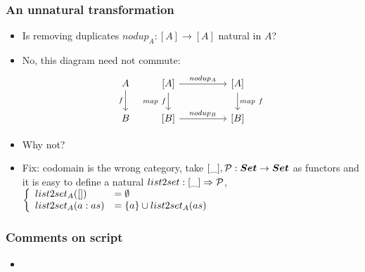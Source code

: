 \documentclass[handout]{beamer}
\newcommand{\To}{\Rightarrow}
\newcommand{\bfsf}[1]{{\boldsymbol{#1}}}
\newcommand{\Set}{\bfsf{Set}}
\begin{document}
\frame
  {   
    \frametitle{An unnatural transformation}\label{Ch3:unnat}

 \begin{itemize}[<+->]
\item Is removing duplicates $nodup_A : [A] \to [A]$ natural in $A$?
\item No, this diagram need not commute:
\[
\begin{tikzcd}[ampersand replacement=\&]
A \arrow[swap]{d}{f} \& {[A]}  \arrow[swap]{d}{map~f}\arrow{rr}{nodup_A} \&\& {[A]}\arrow{d}{map~f}\\
B \& {[B]}  \arrow{rr}{nodup_B}\& \& {[B]}
\end{tikzcd}
\]
\item Why not?
\item Fix: codomain is the wrong category, take $[\_],\powset : \Set\to\Set$ as functors
and it is easy to define a natural $list2set : [\_]\To\powset$,
$\left\{\begin{array}{ll}list2set_A([]) &= \emptyset\\list2set_A(a:as) &=\{a\}\cup list2set_A(as)
\end{array}\right.$
 \end{itemize}

 }




\frame
  {   
    \frametitle{Comments on script}\label{Ch3:comments}

 \begin{itemize}[<+->]
\item 
 \end{itemize}

 }
\end{document}
